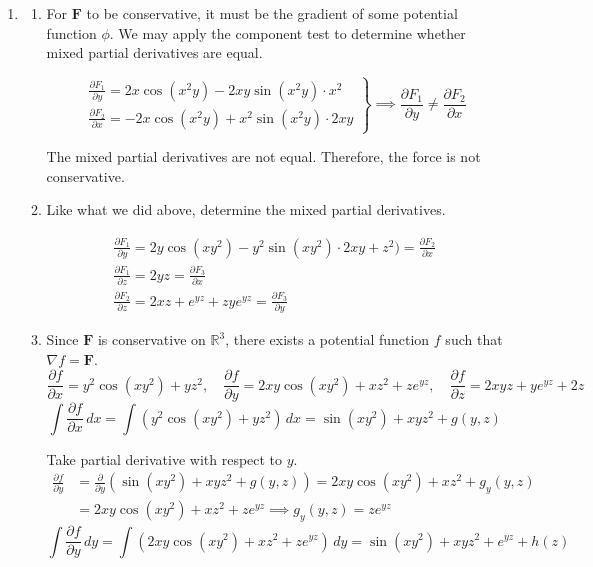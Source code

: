 \documentclass[a4paper, 12pt]{article}
\begin{document}
\begin{enumerate}[leftmargin=*,label=\textbf{\arabic*.}]
\begin{enumerate}[leftmargin=*,label=\textbf{\alph*.}]
\[\boxed{\int_0^{2\pi}\int_{0}^{\pi/4}\int_0^23\rho^2\sin\phi\,d\rho\,d\phi\,d\theta}\]

\end{enumerate}

\item \begin{enumerate}[leftmargin=*,label=\textbf{\alph*.}]
\item For $\mathbf{F}$ to be conservative, it must be the gradient of some potential function $\phi$. We may apply the component test to determine whether mixed partial derivatives are equal.

\[
\left.
\begin{array}{l}
\displaystyle\frac{\partial{F}_1}{\partial y}=2x\cos\left(x^2y\right)-2xy\sin\left(x^2y\right)\cdot x^2\\[1em]
\displaystyle\frac{\partial{F}_2}{\partial x}=-2x\cos\left(x^2y\right)+x^2\sin\left(x^2y\right)\cdot 2xy
\end{array}\right\}\implies\displaystyle\frac{\partial{F}_1}{\partial y}\neq\displaystyle\frac{\partial{F}_2}{\partial x}
\]

The mixed partial derivatives are not equal. Therefore, the force is not conservative.

\item Like what we did above, determine the mixed partial derivatives.

\[
\begin{array}{c}
\displaystyle\frac{\partial{F}_1}{\partial y}=2y\cos\left(xy^2\right)-y^2\sin\left(xy^2\right)\cdot2xy+z^2)=\frac{\partial{F}_2}{\partial x}\\[1em]
\displaystyle\frac{\partial{F}_1}{\partial z}=2yz=\frac{\partial{F}_3}{\partial x}\\[1em]
\displaystyle\frac{\partial{F}_2}{\partial z}=2xz+{e}^{yz}+zy{e}^{yz}=\frac{\partial{F}_3}{\partial y}
\end{array}
\]

\item Since $\mathbf{F}$ is conservative on $\mathbb{R}^3$, there exists a potential function $f$ such that $\nabla f=\mathbf{F}$.
\[\frac{\partial f}{\partial x}=y^2\cos\left(xy^2\right)+yz^2,\quad\frac{\partial f}{\partial y}=2xy\cos\left(xy^2\right)+xz^2+z{e}^{yz},\quad\frac{\partial f}{\partial z}=2xyz+y{e}^{yz}+2z\]
\[\int\frac{\partial f}{\partial x}\,dx=\int\left(y^2\cos\left(xy^2\right)+yz^2\right)\,dx=\sin\left(xy^2\right)+xyz^2+g(y,z)\]

Take partial derivative with respect to $y$.
\begin{align*}\frac{\partial f}{\partial y}&=\frac{\partial}{\partial y}\left(\sin\left(xy^2\right)+xyz^2+g(y,z)\right)=2xy\cos\left(xy^2\right)+xz^2+g_y(y,z)\\[1em]&=2xy\cos\left(xy^2\right)+xz^2+z{e}^{yz}\implies g_y(y,z)=z{e}^{yz}\end{align*}
\[\int\frac{\partial f}{\partial y}\,dy=\int\left(2xy\cos\left(xy^2\right)+xz^2+z{e}^{yz}\right)\,dy=\sin\left(xy^2\right)+xyz^2+{e}^{yz}+h(z)\]


\end{enumerate}
\end{enumerate}
\end{document}
